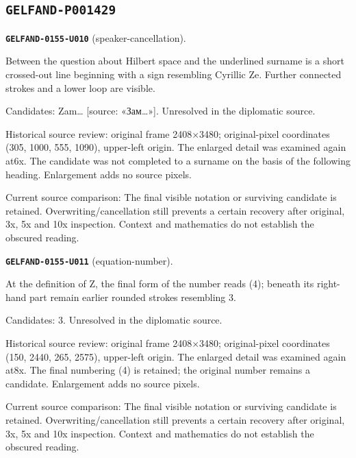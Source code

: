 \subsection*{\texttt{GELFAND-P001429}}
\par\noindent\leavevmode{}\label{GELFAND-0155-U010}\label{GELFAND-P001429:speaker-cancellation}\textbf{\texttt{GELFAND-0155-U010}} (speaker-cancellation).\nopagebreak[4]\par
Between the question about Hilbert space and the underlined surname is a short crossed-out line beginning with a sign resembling Cyrillic Ze. Further connected strokes and a lower loop are visible.\par
Candidates: Zam… [source: «Зам…»]. Unresolved in the diplomatic source.\par
Historical source review: original frame 2408×3480; original-pixel coordinates (305, 1000, 555, 1090), upper-left origin. The enlarged detail was examined again at6x. The candidate was not completed to a surname on the basis of the following heading. Enlargement adds no source pixels.\par
Current source comparison: The final visible notation or surviving candidate is retained. Overwriting/cancellation still prevents a certain recovery after original, 3x, 5x and 10x inspection. Context and mathematics do not establish the obscured reading.\par
\medskip
\par\noindent\leavevmode{}\label{GELFAND-0155-U011}\label{GELFAND-P001429:equation-number}\textbf{\texttt{GELFAND-0155-U011}} (equation-number).\nopagebreak[4]\par
At the definition of Z, the final form of the number reads (4); beneath its right-hand part remain earlier rounded strokes resembling 3.\par
Candidates: 3. Unresolved in the diplomatic source.\par
Historical source review: original frame 2408×3480; original-pixel coordinates (150, 2440, 265, 2575), upper-left origin. The enlarged detail was examined again at8x. The final numbering (4) is retained; the original number remains a candidate. Enlargement adds no source pixels.\par
Current source comparison: The final visible notation or surviving candidate is retained. Overwriting/cancellation still prevents a certain recovery after original, 3x, 5x and 10x inspection. Context and mathematics do not establish the obscured reading.\par
